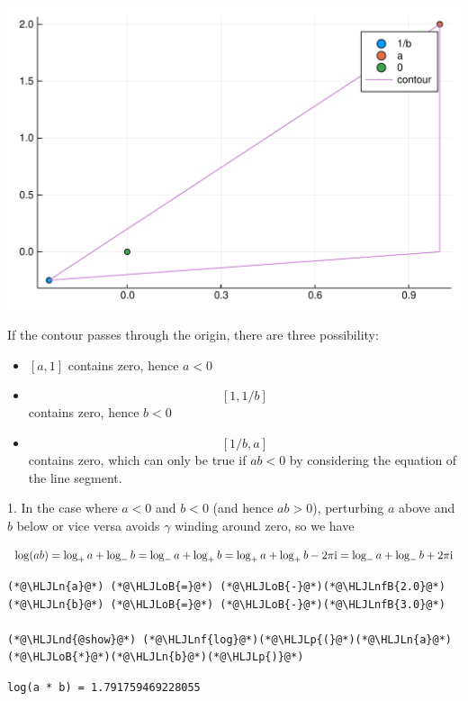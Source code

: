 \documentclass[12pt,a4paper]{article}
\newcommand{\HLJLn}[1]{#1}
\newcommand{\HLJLnd}[1]{\textcolor[RGB]{214,102,97}{#1}}
\newcommand{\HLJLnf}[1]{\textcolor[RGB]{66,102,213}{#1}}
\newcommand{\HLJLnfB}[1]{\textcolor[RGB]{59,151,46}{#1}}
\newcommand{\HLJLoB}[1]{\textcolor[RGB]{102,102,102}{\textbf{#1}}}
\newcommand{\HLJLp}[1]{#1}
\def\I{ {\rm i} }
\begin{document}
\includegraphics[width=\linewidth]{figures/Solutions2_20_1.pdf}

If the contour passes through the origin, there are three possibility: 

\begin{itemize}
\item[1. ] $[a,1]$ contains zero, hence $a < 0$ 


\item[2. ] \[
[1,1/b]
\]
contains zero, hence $b < 0$


\item[3. ] \[
[1/b, a]
\]
contains zero, which can only be true if $a b < 0$ by considering the equation of the line segment.

\end{itemize}
1. In the case where $a < 0$ and $b < 0$ (and hence $a b > 0$), perturbing $a$ above  and $b$ below or vice versa avoids $\gamma$ winding around zero, so we have

\[
\log(a b) = \log_+ a + \log_- b = \log_- a + \log_+ b = \log_+ a + \log_+ b - 2 \pi \I = \log_- a + \log_- b + 2 \pi \I
\]

\begin{lstlisting}
(*@\HLJLn{a}@*) (*@\HLJLoB{=}@*) (*@\HLJLoB{-}@*)(*@\HLJLnfB{2.0}@*)
(*@\HLJLn{b}@*) (*@\HLJLoB{=}@*) (*@\HLJLoB{-}@*)(*@\HLJLnfB{3.0}@*)

(*@\HLJLnd{@show}@*) (*@\HLJLnf{log}@*)(*@\HLJLp{(}@*)(*@\HLJLn{a}@*)(*@\HLJLoB{*}@*)(*@\HLJLn{b}@*)(*@\HLJLp{)}@*)
\end{lstlisting}

\begin{lstlisting}
log(a * b) = 1.791759469228055
\end{lstlisting}
\end{document}
